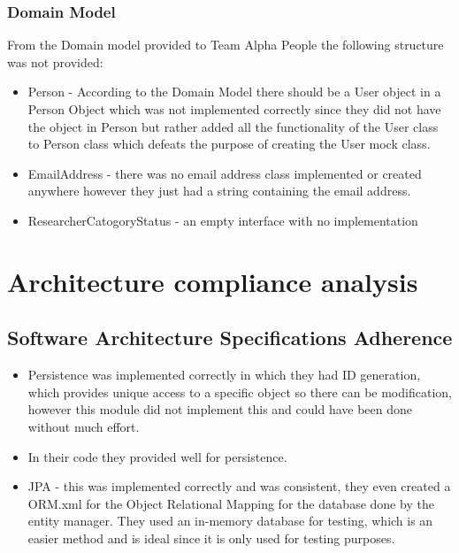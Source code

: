 \documentclass{article}
\begin{document}
	\subsubsection{Domain Model}
	From the Domain model provided to Team Alpha People the following structure was not provided:
	\begin{itemize}
		\item Person - According to the Domain Model there should be a User object in a Person Object which was not implemented correctly since they did not have the object in Person but rather added all the functionality of the User class to Person class which defeats the purpose of creating the User mock class.
		\item EmailAddress - there was no email address class implemented or created anywhere however they just had a string containing the email address.
		\item ResearcherCatogoryStatus - an empty interface with no implementation
	 \end{itemize}
	 
      
    
    
    


\section{Architecture compliance analysis}
	\subsection{Software Architecture Specifications Adherence}
	\begin{itemize}

	\item Persistence was implemented correctly in which they had ID generation, which provides unique access to a specific object so there can be modification, however this module did not implement this and could have been done without much effort. 

			\item In their code they provided well for persistence.
		\item JPA - this was implemented correctly and was consistent, they even created a ORM.xml for the Object Relational Mapping for the database done by the entity manager. They used an in-memory database for testing, which is an easier method and is ideal since it is only used for testing purposes.
	\item@TODO

	\end{itemize}
\end{document}
